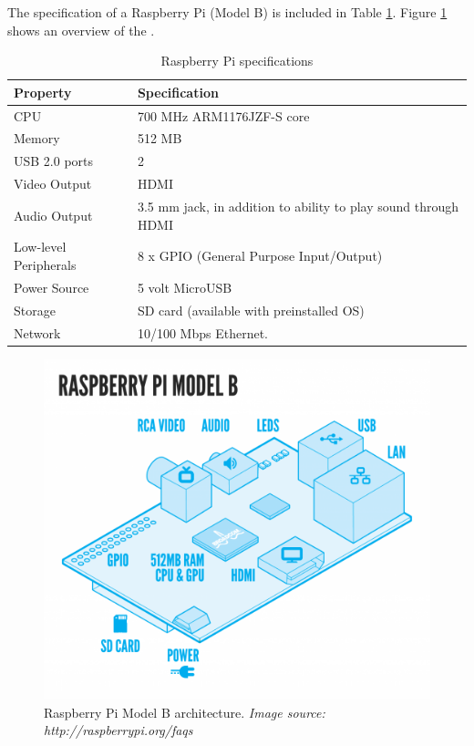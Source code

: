 The specification of a Raspberry Pi (Model B) is included in Table \ref{tab:pi-specs}. Figure \ref{fig:pi-arch-overview} shows an overview of the \rpi{}.        

\begin{table}
\begin{tabular}{|p{6.0cm} | p{6.0cm} |}
\hline 
\textbf{Property} & \textbf{Specification} \\
\hline
CPU & 700 MHz ARM1176JZF-S core \\
\hline
Memory & 512 MB \\
\hline
USB 2.0 ports & 2 \\
\hline
Video Output & HDMI \\
\hline
Audio Output & 3.5 mm jack, in addition to ability to play sound through HDMI \\
\hline
Low-level Peripherals & 8 x GPIO (General Purpose Input/Output) \\
\hline
Power Source & 5 volt MicroUSB \\
\hline
Storage & SD card (available with preinstalled OS) \\
\hline
Network & 10/100 Mbps Ethernet.  \\
\hline
\end{tabular}
\caption{Raspberry Pi specifications}
\label{tab:pi-specs}
\end{table}

\begin{figure}[H] 
	\centering
		\includegraphics[width=0.6\paperwidth]{Pictures/rpi-arch-overview.png}
	\caption{Raspberry Pi Model B architecture. \emph{Image source: http://raspberrypi.org/faqs} }
	\label{fig:pi-arch-overview}
\end{figure}
 
